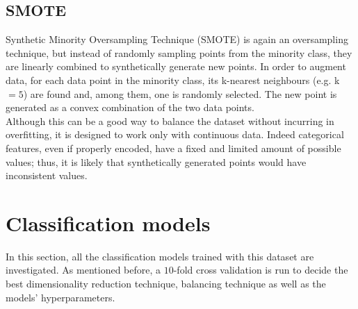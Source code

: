 \documentclass[letterpaper]{article}
\begin{document}
	\subsection{SMOTE}
	Synthetic Minority Oversampling Technique (SMOTE) is again an oversampling technique, but instead of randomly sampling points from the minority class, they are linearly combined to synthetically generate new points. In order to augment data, for each data point in the minority class, its k-nearest neighbours (e.g. k$=5$) are found and, among them, one is randomly selected. The new point is generated as a convex combination of the two data points. \\
	Although this can be a good way to balance the dataset without incurring in overfitting, it is designed to work only with continuous data. Indeed categorical features, even if properly encoded, have a fixed and limited amount of possible values; thus, it is likely that synthetically generated points would have inconsistent values. 
	
	\section{Classification models} \label{classification}
	In this section, all the classification models trained with this dataset are investigated. As mentioned before, a $10$-fold cross validation is run to decide the best dimensionality reduction technique, balancing technique as well as the models' hyperparameters. 
\end{document}
